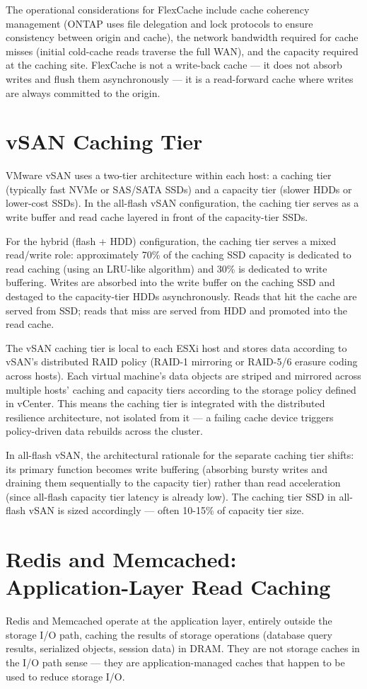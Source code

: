 The operational considerations for FlexCache include cache coherency management (ONTAP uses file delegation and lock protocols to ensure consistency between origin and cache), the network bandwidth required for cache misses (initial cold-cache reads traverse the full WAN), and the capacity required at the caching site. FlexCache is not a write-back cache --- it does not absorb writes and flush them asynchronously --- it is a read-forward cache where writes are always committed to the origin.

\section{vSAN Caching Tier}
VMware vSAN uses a two-tier architecture within each host: a caching tier (typically fast NVMe or SAS/SATA SSDs) and a capacity tier (slower HDDs or lower-cost SSDs). In the all-flash vSAN configuration, the caching tier serves as a write buffer and read cache layered in front of the capacity-tier SSDs.

For the hybrid (flash + HDD) configuration, the caching tier serves a mixed read/write role: approximately 70\% of the caching SSD capacity is dedicated to read caching (using an LRU-like algorithm) and 30\% is dedicated to write buffering. Writes are absorbed into the write buffer on the caching SSD and destaged to the capacity-tier HDDs asynchronously. Reads that hit the cache are served from SSD; reads that miss are served from HDD and promoted into the read cache.

The vSAN caching tier is local to each ESXi host and stores data according to vSAN's distributed RAID policy (RAID-1 mirroring or RAID-5/6 erasure coding across hosts). Each virtual machine's data objects are striped and mirrored across multiple hosts'{} caching and capacity tiers according to the storage policy defined in vCenter. This means the caching tier is integrated with the distributed resilience architecture, not isolated from it --- a failing cache device triggers policy-driven data rebuilds across the cluster.

In all-flash vSAN, the architectural rationale for the separate caching tier shifts: its primary function becomes write buffering (absorbing bursty writes and draining them sequentially to the capacity tier) rather than read acceleration (since all-flash capacity tier latency is already low). The caching tier SSD in all-flash vSAN is sized accordingly --- often 10-15\% of capacity tier size.

\section{Redis and Memcached: Application-Layer Read Caching}
Redis and Memcached operate at the application layer, entirely outside the storage I/O path, caching the results of storage operations (database query results, serialized objects, session data) in DRAM. They are not storage caches in the I/O path sense --- they are application-managed caches that happen to be used to reduce storage I/O.

